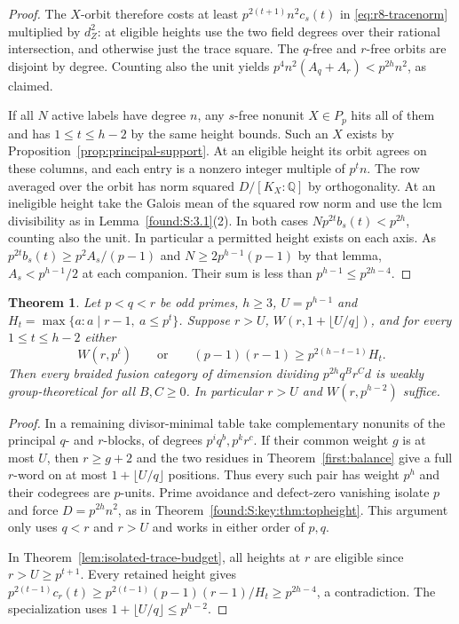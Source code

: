 \documentclass[11pt,a4paper]{article}
\numberwithin{equation}{section}
\newtheorem{theorem}{Theorem}[section]
\theoremstyle{remark}
\newcommand{\QQ}{\mathbb Q}
\begin{document}
\begin{proof}
The $X$-orbit therefore costs at least $p^{2(t+1)}n^2 c_s(t)$ in
\eqref{eq:r8-tracenorm} multiplied by $d_Z^2$: at eligible heights
use the two field degrees over their rational intersection, and
otherwise just the trace square. The $q$-free and $r$-free orbits
are disjoint by degree. Counting also the unit yields
$p^4n^2(A_q+A_r)<p^{2h}n^2$, as claimed.

If all $N$ active labels have degree $n$, any $s$-free nonunit
$X\in P_p$ hits all of them and has $1\le t\le h-2$ by the same
height bounds. Such an $X$ exists by Proposition~\ref{prop:principal-support}.
At an eligible height its orbit agrees on these columns, and each
entry is a nonzero integer multiple of $p^t n$. The row averaged
over the orbit has norm squared $D/[K_X:\QQ]$ by orthogonality.
At an ineligible height take the Galois mean of the squared row norm
and use the lcm divisibility as in Lemma~\ref{found:S:3.1}(2).
In both cases $N p^{2t} b_s(t)<p^{2h}$, counting also the unit.
In particular a permitted height exists on each axis. As
$p^{2t}b_s(t)\ge p^2 A_s/(p-1)$ and $N\ge 2p^{h-1}(p-1)$ by
that lemma, $A_s<p^{h-1}/2$ at each companion. Their sum is less
than $p^{h-1}\le p^{2h-4}$.
\end{proof}

\begin{theorem}\label{found:S:3.2}\label{found:S:key:thm:twoarbitrary}
Let $p<q<r$ be odd primes, $h\ge3$, $U=p^{h-1}$ and
$H_t=\max\{a:a\mid r-1,\ a\le p^t\}$. Suppose $r>U$,
$W(r,1+\lfloor U/q\rfloor)$, and for every $1\le t\le h-2$ either
\[
 W(r,p^t)\qquad\text{or}\qquad
 (p-1)(r-1)\ge p^{2(h-t-1)}H_t .
\]
Then every braided fusion category of dimension dividing
$p^{2h}q^Br^Cd$ is weakly group-theoretical for all $B,C\ge0$.
In particular $r>U$ and $W(r,p^{h-2})$ suffice.
\end{theorem}
\begin{proof}
In a remaining divisor-minimal table take complementary nonunits of
the principal $q$- and $r$-blocks, of degrees $p^i q^b,p^k r^c$.
If their common weight $g$ is at most $U$, then $r\ge g+2$ and the
two residues in Theorem~\ref{first:balance} give a full $r$-word on at
most $1+\lfloor U/q\rfloor$ positions. Thus every such pair has
weight $p^h$ and their codegrees are $p$-units. Prime avoidance and
defect-zero vanishing isolate $p$ and force $D=p^{2h}n^2$, as in
Theorem~\ref{found:S:key:thm:topheight}. This argument only uses
$q<r$ and $r>U$ and works in either order of $p,q$.

In Theorem~\ref{lem:isolated-trace-budget}, all heights at $r$ are
eligible since $r>U\ge p^{t+1}$. Every retained height gives
$p^{2(t-1)}c_r(t)\ge p^{2(t-1)}(p-1)(r-1)/H_t\ge p^{2h-4}$,
a contradiction. The specialization uses $1+\lfloor U/q\rfloor\le p^{h-2}$.
\end{proof}
\end{document}
